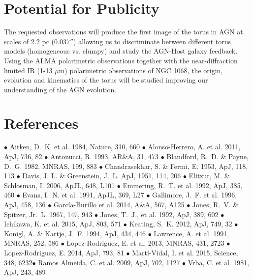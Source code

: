 \documentclass[12pt,a4paper]{article}  %
\begin{document}

\section{Potential for Publicity}


The requested observations will produce the first image of the torus in AGN at scales of 2.2 pc (0.037$''$) allowing us to discriminate between different torus models (homogeneous vs. clumpy) and study the AGN-Host galaxy feedback. Using the ALMA polarimetric observations together with the near-diffraction limited IR (1-13 $\mu$m) polarimetric observations of NGC 1068, the origin, evolution and kinematics of the torus will be studied improving our understanding of the AGN evolution. 


\section{References}


$\bullet$ Aitken, D.~K. et al. 1984, Nature, 310, 660 $\bullet$ Alonso-Herrero, A. et al. 2011, ApJ, 736, 82 $\bullet$ Antonucci, R. 1993, AR\&A, 31, 473 $\bullet$ Blandford, R.~D. \& Payne, D.~G. 1982, MNRAS, 199, 883 $\bullet$ Chandrasekhar, S. \& Fermi, E. 1953, ApJ, 118, 113 $\bullet$ Davis, J. L. \& Greenstein, J.~L. ApJ, 1951, 114, 206 $\bullet$ Elitzur, M. \& Schlosman, I. 2006, ApJL, 648, L101 $\bullet$ Emmering, R.~T. et al. 1992, ApJ, 385, 460 $\bullet$ Evans, I.~N. et al. 1991, ApJL, 369, L27 $\bullet$ Gallimore, J.~F. et al. 1996, ApJ, 458, 136 $\bullet$ Garc\'ia-Burillo et al. 2014, A\&A, 567, A125 $\bullet$ Jones, R.~V. \& Spitzer, Jr.~L. 1967, 147, 943 $\bullet$ Jones, T.~J., et al. 1992, ApJ, 389, 602 $\bullet$ Ichikawa, K. et al. 2015, ApJ, 803, 571 $\bullet$ Keating, S.~K. 2012, ApJ, 749, 32 $\bullet$ Konigl, A. \& Kartje, J.~F. 1994, ApJ, 434, 446 $\bullet$ Lawrence, A. et al. 1991, MNRAS, 252, 586 $\bullet$ Lopez-Rodriguez, E. et al. 2013, MNRAS, 431, 2723 $\bullet$ Lopez-Rodriguez, E. 2014, ApJ, 793, 81 $\bullet$ Mart\'i-Vidal, I. et al. 2015, Science, 348, 6232$\bullet$ Ramos Almeida, C. et al. 2009, ApJ, 702, 1127 $\bullet$ Vrba, C.  et al. 1981, ApJ, 243, 489
\end{document}
